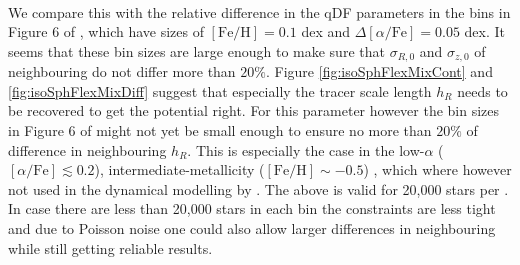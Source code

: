 \\We compare this with the relative difference in the qDF parameters in the bins in Figure 6 of \cite{2013ApJ...779..115B}, which have sizes of $[\mathrm{Fe}/\mathrm{H}] = 0.1$ dex and $\Delta [\alpha/\mathrm{Fe}] = 0.05$ dex. It seems that these bin sizes are large enough to make sure that $\sigma_{R,0}$ and $\sigma_{z,0}$ of neighbouring \MAPs{} do not differ more than $20\%$. Figure \ref{fig:isoSphFlexMixCont} and \ref{fig:isoSphFlexMixDiff} suggest that especially the tracer scale length $h_R$ needs to be recovered to get the potential right. For this parameter however the bin sizes in Figure 6 of \cite{2013ApJ...779..115B} might not yet be small enough to ensure no more than $20\%$ of difference in neighbouring $h_R$. This is especially the case in the low-$\alpha$ ($[\alpha/\mathrm{Fe}] \lesssim 0.2$), intermediate-metallicity ($[\mathrm{Fe}/\mathrm{H}] \sim -0.5$) \MAPs{}, which where however not used in the dynamical modelling by \citet{2013ApJ...779..115B}. The above is valid for 20,000 stars per \MAP{}. In case there are less than 20,000 stars in each bin the constraints are less tight and due to Poisson noise one could also allow larger differences in neighbouring \MAPs{} while still getting reliable results.\\

